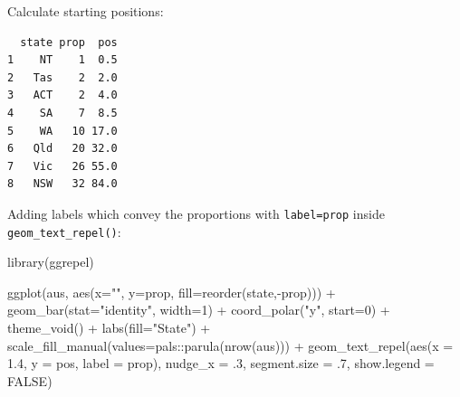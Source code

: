 \documentclass[
  letterpaper,
  DIV=11,
  numbers=noendperiod]{scrreprt}
\newenvironment{Shaded}{\begin{snugshade}}{\end{snugshade}}
\newcommand{\AttributeTok}[1]{\textcolor[rgb]{0.40,0.45,0.13}{#1}}
\newcommand{\ConstantTok}[1]{\textcolor[rgb]{0.56,0.35,0.01}{#1}}
\newcommand{\DecValTok}[1]{\textcolor[rgb]{0.68,0.00,0.00}{#1}}
\newcommand{\FloatTok}[1]{\textcolor[rgb]{0.68,0.00,0.00}{#1}}
\newcommand{\FunctionTok}[1]{\textcolor[rgb]{0.28,0.35,0.67}{#1}}
\newcommand{\NormalTok}[1]{\textcolor[rgb]{0.00,0.23,0.31}{#1}}
\newcommand{\OtherTok}[1]{\textcolor[rgb]{0.00,0.23,0.31}{#1}}
\newcommand{\SpecialCharTok}[1]{\textcolor[rgb]{0.37,0.37,0.37}{#1}}
\newcommand{\StringTok}[1]{\textcolor[rgb]{0.13,0.47,0.30}{#1}}
\begin{document}
Calculate starting positions:

\begin{Shaded}
\end{Shaded}

\begin{verbatim}
  state prop  pos
1    NT    1  0.5
2   Tas    2  2.0
3   ACT    2  4.0
4    SA    7  8.5
5    WA   10 17.0
6   Qld   20 32.0
7   Vic   26 55.0
8   NSW   32 84.0
\end{verbatim}

Adding labels which convey the proportions with \texttt{label=prop}
inside \texttt{geom\_text\_repel()}:

\begin{Shaded}
\begin{Highlighting}[]
\FunctionTok{library}\NormalTok{(ggrepel)}

\FunctionTok{ggplot}\NormalTok{(aus, }\FunctionTok{aes}\NormalTok{(}\AttributeTok{x=}\StringTok{""}\NormalTok{, }\AttributeTok{y=}\NormalTok{prop, }\AttributeTok{fill=}\FunctionTok{reorder}\NormalTok{(state,}\SpecialCharTok{{-}}\NormalTok{prop))) }\SpecialCharTok{+}
  \FunctionTok{geom\_bar}\NormalTok{(}\AttributeTok{stat=}\StringTok{"identity"}\NormalTok{, }\AttributeTok{width=}\DecValTok{1}\NormalTok{) }\SpecialCharTok{+}
  \FunctionTok{coord\_polar}\NormalTok{(}\StringTok{"y"}\NormalTok{, }\AttributeTok{start=}\DecValTok{0}\NormalTok{) }\SpecialCharTok{+}
  \FunctionTok{theme\_void}\NormalTok{() }\SpecialCharTok{+}
  \FunctionTok{labs}\NormalTok{(}\AttributeTok{fill=}\StringTok{"State"}\NormalTok{) }\SpecialCharTok{+}
  \FunctionTok{scale\_fill\_manual}\NormalTok{(}\AttributeTok{values=}\NormalTok{pals}\SpecialCharTok{::}\FunctionTok{parula}\NormalTok{(}\FunctionTok{nrow}\NormalTok{(aus))) }\SpecialCharTok{+}
  \FunctionTok{geom\_text\_repel}\NormalTok{(}\FunctionTok{aes}\NormalTok{(}\AttributeTok{x =} \FloatTok{1.4}\NormalTok{, }\AttributeTok{y =}\NormalTok{ pos, }\AttributeTok{label =}\NormalTok{ prop), }
                    \AttributeTok{nudge\_x =}\NormalTok{ .}\DecValTok{3}\NormalTok{, }
                    \AttributeTok{segment.size =}\NormalTok{ .}\DecValTok{7}\NormalTok{, }
                    \AttributeTok{show.legend =} \ConstantTok{FALSE}\NormalTok{) }
\end{Highlighting}
\end{Shaded}
\end{document}
